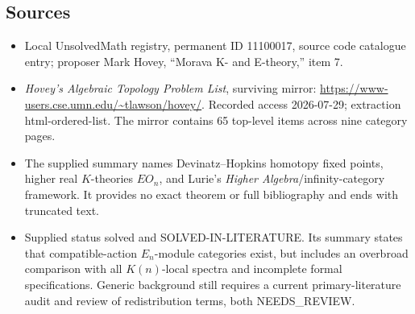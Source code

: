 \documentclass[11pt]{article}
\begin{document}
\subsection{Sources}
\begin{itemize}
\item Local UnsolvedMath registry, permanent ID 11100017, source code catalogue entry; proposer Mark Hovey, ``Morava K- and E-theory,'' item 7.
\item \emph{Hovey's Algebraic Topology Problem List}, surviving mirror: \url{https://www-users.cse.umn.edu/~tlawson/hovey/}. Recorded access 2026-07-29; extraction html-ordered-list. The mirror contains 65 top-level items across nine category pages.
\item The supplied summary names Devinatz--Hopkins homotopy fixed points, higher real \(K\)-theories \(EO_n\), and Lurie's \emph{Higher Algebra}/infinity-category framework. It provides no exact theorem or full bibliography and ends with truncated text.
\item Supplied status solved and SOLVED-IN-LITERATURE. Its summary states that compatible-action \(E_n\)-module categories exist, but includes an overbroad comparison with all \(K(n)\)-local spectra and incomplete formal specifications. Generic background still requires a current primary-literature audit and review of redistribution terms, both NEEDS\_REVIEW.
\end{itemize}
\end{document}
